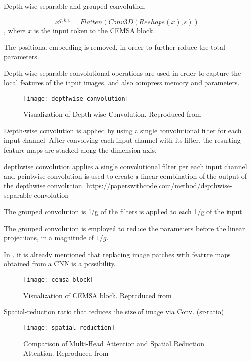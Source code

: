 Depth-wise separable and grouped convolution.

$$x^{q,k,v}=Flatten(Conv3D(Reshape(x),s))$$,
where $x$ is the input token to the CEMSA block.

The positional embedding is removed, in order to further reduce the total parameters.

Depth-wise separable convolutional operations are used in order to capture the local features of the input images, and also compress memory and parameters.

\begin{figure}
    \centering
    \texttt{[image: depthwise-convolution]}
    \caption{Visualization of Depth-wise Convolution. Reproduced from }
    \label{fig:depthwise-convolution}
\end{figure}

Depth-wise convolution is applied by using a single convolutional filter for each input channel. After convolving each input channel with its filter, the resulting feature maps are stacked along the dimension axis. 

depthwise convolution applies a single convolutional filter per each input channel and pointwise convolution is used to create a linear combination of the output of the depthwise convolution. https://paperswithcode.com/method/depthwise-separable-convolution

The grouped convolution is 1/g of the filters is applied to each 1/g of the input

The grouped convolution is employed to reduce the parameters before the linear projections, in a magnitude of $1/g$.

In \cite{Dosovitskiy2021-be}, it is already mentioned that replacing image patches with feature maps obtained from a CNN is a possibility.

\begin{figure}
    \centering
    \texttt{[image: cemsa-block]}
    \caption{Visualization of CEMSA block. Reproduced from }
    \label{fig:cemsa-block}
\end{figure}

Spatial-reduction ratio that reduces the size of image via Conv. (sr-ratio)

\begin{figure}
    \centering
    \texttt{[image: spatial-reduction]}
    \caption{Comparison of Multi-Head Attention and Spatial Reduction Attention. Reproduced from }
    \label{fig:spatial-reduction-attention}
\end{figure}

